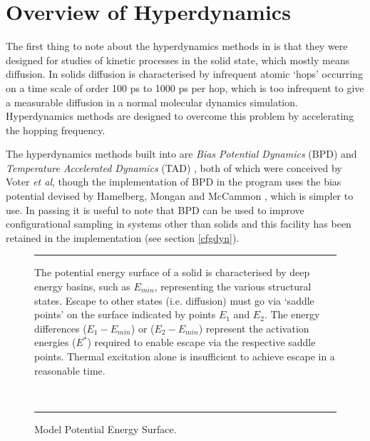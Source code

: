 
\section{Overview of Hyperdynamics}
The first thing to note about the hyperdynamics methods in
\D{} is that they were designed for studies of kinetic processes in 
the solid state, which mostly means diffusion. In solids diffusion is
characterised by infrequent atomic `hops' occurring on a time scale of
order 100 ps to 1000 ps per hop, which is too infrequent to give a
measurable diffusion in a normal molecular dynamics
simulation. Hyperdynamics methods are designed to overcome this
problem by accelerating the hopping frequency.

The hyperdynamics methods built into \D{} are {\em Bias Potential
Dynamics} (BPD) \cite{voter-97a} and {\em Temperature Accelerated
Dynamics} (TAD) \cite{voter-00a}, both of which were conceived by
Voter {\em et al}, though the implementation of BPD in the program
uses the bias potential devised by Hamelberg, Mongan and McCammon
\cite{hamelberg-04a}, which is simpler to use. 
In passing it is useful to note that BPD can be used to improve
configurational sampling in systems other than solids and this
facility has been retained in the \D{} implementation (see section
\ref{cfgdyn}).

\begin{figure}[ht]
\hrule
\vspace{1.0cm}
\begin{center}
\centerline{}
\end{center}
\caption{Model Potential Energy Surface.\label{potsurf}}
The potential energy surface of a solid is characterised by deep
energy basins, such as $E_{min}$, representing the various structural
states. Escape to other states (i.e. diffusion) must go via `saddle
points' on the surface indicated by points $E_{1}$ and $E_{2}$. The
energy differences ($E_{1}-E_{min}$) or ($E_{2}-E_{min}$) represent
the activation energies ($E^{*}$) required to enable escape via the
respective saddle points. Thermal excitation alone is insufficient to
achieve escape in a reasonable time.

~
\hrule
\end{figure}

